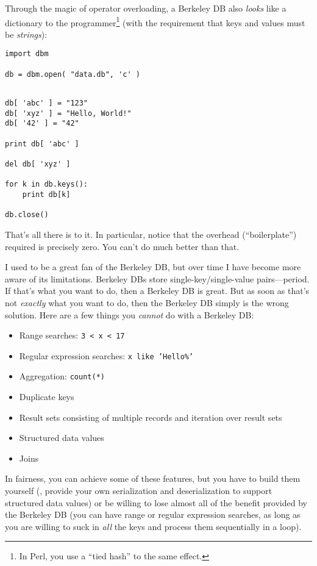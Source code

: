 Through the magic of operator overloading, a Berkeley DB also
\emph{looks} like a dictionary to the programmer\footnote{In Perl, you
  use a ``tied hash'' to the same effect.}  (with the requirement that
keys and values must be \emph{strings}):

\begin{verbatim}
import dbm

db = dbm.open( "data.db", 'c' )
\end{verbatim}\pagebreak

\begin{verbatim}

db[ 'abc' ] = "123"
db[ 'xyz' ] = "Hello, World!"
db[ '42' ] = "42"
    
print db[ 'abc' ]

del db[ 'xyz' ]

for k in db.keys():
    print db[k]

db.close()
\end{verbatim}

That's all there is to it. In particular, notice that the overhead
(``boilerplate'') required is precisely zero. You can't do much better
than that.

I used to be a great fan of the Berkeley DB, but over time I have
become more aware of its limitations. Berkeley DBs store
single-key/single-value pairs---period. If that's what you want to do,
then a Berkeley DB is great. But as soon as that's not \emph{exactly}
what you want to do, then the Berkeley DB simply is the wrong
solution.  Here are a few things you \emph{cannot} do with a Berkeley
DB:

\begin{itemize}
\item Range searches: \texttt{3 < x < 17}
\item Regular expression searches: \texttt{x like 'Hello\%'}
\item Aggregation: \texttt{count(*)}
\item Duplicate keys
\item Result sets consisting of multiple records and iteration over
  result sets
\item Structured data values
\item Joins
\end{itemize}

In fairness, you can achieve some of these features, but you have to
build them yourself (\eg, provide your own serialization and
deserialization to support structured data values) or be willing to
lose almost all of the benefit provided by the Berkeley DB (you can
have range or regular expression searches, as long as you are willing
to suck in \emph{all} the keys and process them sequentially in a
loop).

